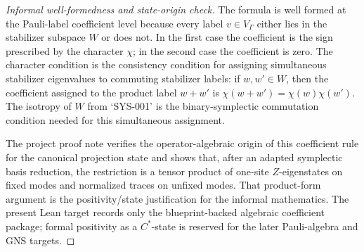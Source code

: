 \documentclass{article}
\begin{document}
\begin{proof}[Informal well-formedness and state-origin check]
The formula is well formed at the Pauli-label coefficient level because every
label \(v\in V_\Gamma\) either lies in the stabilizer subspace \(W\) or does
not.  In the first case the coefficient is the sign prescribed by the
character \(\chi\); in the second case the coefficient is zero.  The character
condition is the consistency condition for assigning simultaneous stabilizer
eigenvalues to commuting stabilizer labels: if \(w,w'\in W\), then the
coefficient assigned to the product label \(w+w'\) is
\(\chi(w+w')=\chi(w)\chi(w')\).  The isotropy of \(W\) from `SYS-001' is the
binary-symplectic commutation condition needed for this simultaneous
assignment.

The project proof note verifies the operator-algebraic origin of this
coefficient rule for the canonical projection state and shows that, after an
adapted symplectic basis reduction, the restriction is a tensor product of
one-site \(Z\)-eigenstates on fixed modes and normalized traces on unfixed
modes.  That product-form argument is the positivity/state justification for
the informal mathematics.  The present Lean target records only the
blueprint-backed algebraic coefficient package; formal positivity as a
\(C^*\)-state is reserved for the later Pauli-algebra and GNS targets.
\end{proof}
\end{document}
